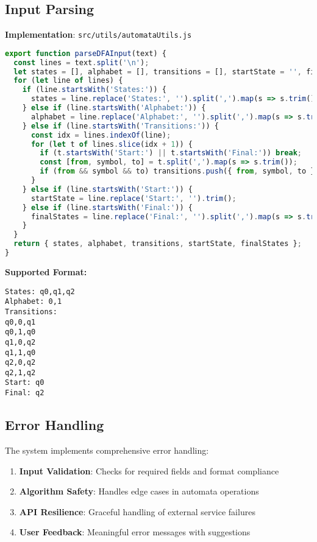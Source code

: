 \documentclass[12pt]{article}
\begin{document}
\subsection{Input Parsing}
\textbf{Implementation}: \texttt{src/utils/automataUtils.js}
\begin{lstlisting}[language=JavaScript]
export function parseDFAInput(text) {
  const lines = text.split('\n');
  let states = [], alphabet = [], transitions = [], startState = '', finalStates = [];
  for (let line of lines) {
    if (line.startsWith('States:')) {
      states = line.replace('States:', '').split(',').map(s => s.trim());
    } else if (line.startsWith('Alphabet:')) {
      alphabet = line.replace('Alphabet:', '').split(',').map(s => s.trim());
    } else if (line.startsWith('Transitions:')) {
      const idx = lines.indexOf(line);
      for (let t of lines.slice(idx + 1)) {
        if (t.startsWith('Start:') || t.startsWith('Final:')) break;
        const [from, symbol, to] = t.split(',').map(s => s.trim());
        if (from && symbol && to) transitions.push({ from, symbol, to });
      }
    } else if (line.startsWith('Start:')) {
      startState = line.replace('Start:', '').trim();
    } else if (line.startsWith('Final:')) {
      finalStates = line.replace('Final:', '').split(',').map(s => s.trim());
    }
  }
  return { states, alphabet, transitions, startState, finalStates };
}
\end{lstlisting}
\textbf{Supported Format:}
\begin{lstlisting}
States: q0,q1,q2
Alphabet: 0,1
Transitions:
q0,0,q1
q0,1,q0
q1,0,q2
q1,1,q0
q2,0,q2
q2,1,q2
Start: q0
Final: q2
\end{lstlisting}

\subsection{Error Handling}
The system implements comprehensive error handling:
\begin{enumerate}
    \item \textbf{Input Validation}: Checks for required fields and format compliance
    \item \textbf{Algorithm Safety}: Handles edge cases in automata operations
    \item \textbf{API Resilience}: Graceful handling of external service failures
    \item \textbf{User Feedback}: Meaningful error messages with suggestions
\end{enumerate}
\end{document}
